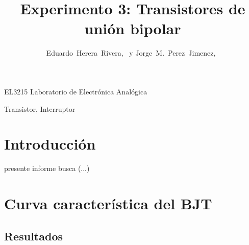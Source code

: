 \documentclass[journal]{IEEEtran}
\begin{document}
%
\title{Experimento 3: Transistores de unión bipolar}


\author{Eduardo~Herera~Rivera,~
        y Jorge~M.~Perez~Jimenez,~
}


%
{EL3215 Laboratorio de Electrónica Analógica}


\maketitle


\begin{abstract}

\end{abstract}

\begin{IEEEkeywords}
Transistor, Interruptor
\end{IEEEkeywords}


\section{Introducción}

 presente informe busca	(...)



\section{Curva característica del BJT}
\subsection{Resultados}
\end{document}
